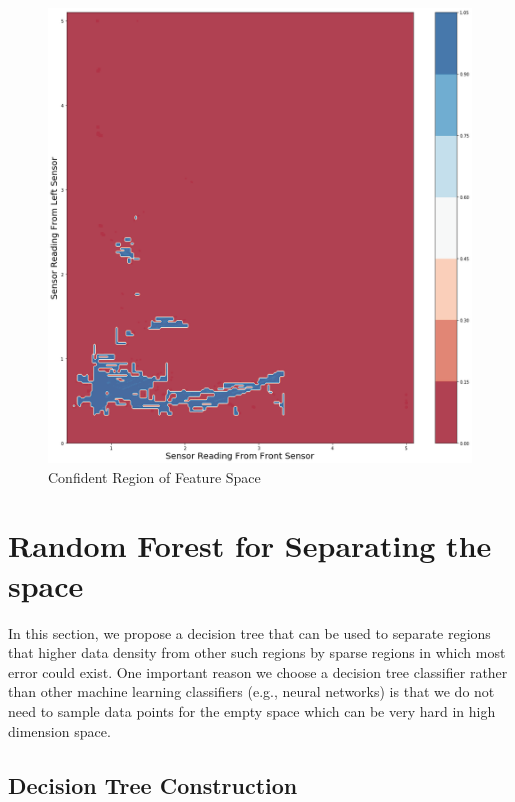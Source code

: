 \documentclass[11pt,onecolumn]{IEEEtran}
\begin{document}
\begin{figure}[h]
    \centering
    \caption{Confident Region of Feature Space}
    \includegraphics[scale=0.25]{image/robot2s.png} 
\end{figure}


\section{Random Forest for Separating the space}
In this section, we propose a decision tree that can be used to separate regions that higher data density from other such regions by sparse regions in which most error could exist. One important reason we choose a decision tree classifier rather than other machine learning classifiers (e.g., neural networks) is that we do not need to sample data points for the empty space which can be very hard in high dimension space.
\subsection{Decision Tree Construction}
\end{document}
